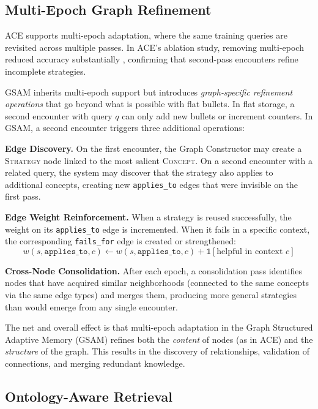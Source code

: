 \documentclass[12pt,a4paper,oneside]{article}
\begin{document}
\subsection{Multi-Epoch Graph Refinement}
\label{sec:multiepoch}

ACE supports multi-epoch adaptation, where the same training queries are revisited across multiple passes. In ACE's ablation study, removing multi-epoch reduced accuracy substantially \citep{ace2025}, confirming that second-pass encounters refine incomplete strategies.

GSAM inherits multi-epoch support but introduces \textit{graph-specific refinement operations} that go beyond what is possible with flat bullets. In flat storage, a second encounter with query $q$ can only add new bullets or increment counters. In GSAM, a second encounter triggers three additional operations:

\textbf{Edge Discovery.} On the first encounter, the Graph Constructor may create a \textsc{Strategy} node linked to the most salient \textsc{Concept}. On a second encounter with a related query, the system may discover that the strategy also applies to additional concepts, creating new \texttt{applies\_to} edges that were invisible on the first pass.

\textbf{Edge Weight Reinforcement.} When a strategy is reused successfully, the weight on its \texttt{applies\_to} edge is incremented. When it fails in a specific context, the corresponding \texttt{fails\_for} edge is created or strengthened:
\begin{equation}
w(s, \texttt{applies\_to}, c) \leftarrow w(s, \texttt{applies\_to}, c) + \mathbb{1}[\text{helpful in context } c]
\end{equation}

\textbf{Cross-Node Consolidation.} After each epoch, a consolidation pass identifies nodes that have acquired similar neighborhoods (connected to the same concepts via the same edge types) and merges them, producing more general strategies than would emerge from any single encounter.

The net and overall effect is that multi-epoch adaptation in the Graph Structured Adaptive Memory (GSAM) refines both the \textit{content} of nodes (as in ACE) and the \textit{structure} of the graph. This results in the discovery of relationships, validation of connections, and merging redundant knowledge.

\subsection{Ontology-Aware Retrieval}
\label{sec:retrieval}
\end{document}
